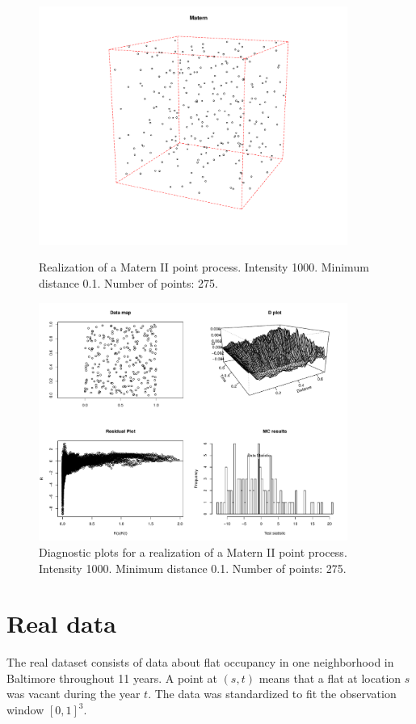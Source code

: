\documentclass{article}
\begin{document}
\begin{figure}[p]
  \centering
    \includegraphics[width=0.9\textwidth]{PP_Matern_II_1000_0p1_275.pdf}
  \caption{Realization of a Matern II point process. Intensity 1000. Minimum distance 0.1. Number of points: 275.}
  \label{fig:matern2PP}

\vspace*{\floatsep}

    \includegraphics[width=0.9\textwidth]{diag_Matern_II_1000_0p1_275.pdf}
  \caption{Diagnostic plots for a realization of a Matern II point process.  Intensity 1000. Minimum distance 0.1. Number of points: 275.}
  \label{fig:matern2Diag}
\end{figure}





\section{Real data}
The real dataset consists of data about flat occupancy in one neighborhood in Baltimore throughout 11 years. A point at $(s,t)$ means that a flat at location $s$ was vacant during the year $t$. The data was standardized to fit the observation window $[0,1]^3$. 
\end{document}
